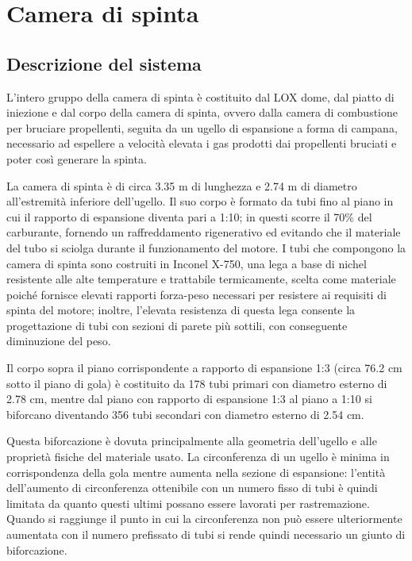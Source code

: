 \section{Camera di spinta}
\label{sec:camera spinta}

\subsection{Descrizione del sistema}
\label{subsec:descrizione camera spinta}

L’intero gruppo della camera di spinta è costituito dal LOX dome, dal piatto di iniezione e dal corpo della camera di spinta, ovvero dalla camera di combustione per bruciare propellenti, seguita da un ugello di espansione a forma di campana, necessario ad espellere a velocità elevata i gas prodotti dai propellenti bruciati e poter così generare la spinta.

La camera di spinta è di circa 3.35 m di lunghezza e 2.74 m di diametro all'estremità inferiore dell'ugello. Il suo corpo è formato da tubi fino al piano in cui il rapporto di espansione diventa pari a 1:10; in questi scorre il 70\% del carburante, fornendo un raffreddamento rigenerativo ed evitando che il materiale del tubo si sciolga durante il funzionamento del motore.
I tubi che compongono la camera di spinta sono costruiti in Inconel X-750, una lega a base di nichel resistente alle alte temperature e trattabile termicamente, scelta come materiale poiché fornisce elevati rapporti forza-peso necessari per resistere ai requisiti di spinta del motore; inoltre, l'elevata resistenza di questa lega consente la progettazione di tubi con sezioni di parete più sottili, con conseguente diminuzione del peso.

Il corpo sopra il piano corrispondente a rapporto di espansione 1:3 (circa 76.2 cm sotto il piano di gola) è costituito da 178 tubi primari con diametro esterno di 2.78 cm, mentre dal piano con rapporto di espansione 1:3 al piano a 1:10 si biforcano diventando 356 tubi secondari con diametro esterno di 2.54 cm.

Questa biforcazione è dovuta principalmente alla geometria dell'ugello e alle proprietà fisiche del materiale usato. La circonferenza di un ugello è minima in corrispondenza della gola mentre aumenta nella sezione di espansione: l'entità dell'aumento di circonferenza ottenibile con un numero fisso di tubi è quindi limitata da quanto questi ultimi possano essere lavorati per rastremazione. Quando si raggiunge il punto in cui la circonferenza non può essere ulteriormente aumentata con il numero prefissato di tubi si rende quindi necessario un giunto di biforcazione.

